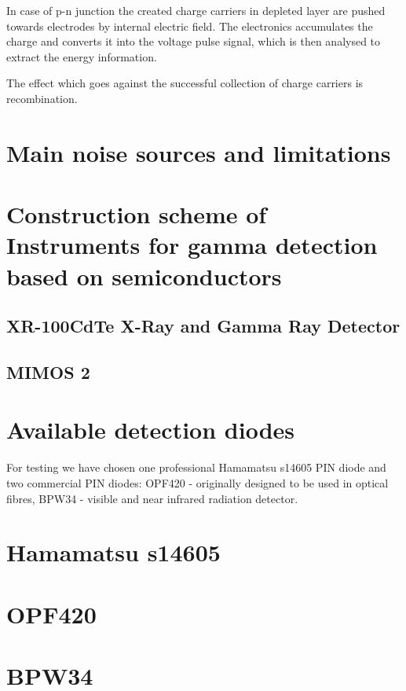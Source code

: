 \par
In case of p-n junction the created charge carriers in depleted layer are pushed towards electrodes by internal electric field. The  electronics accumulates the charge and converts it into the voltage pulse signal, which is then analysed to extract the energy information.


\par
The effect which goes against the successful collection of charge carriers is recombination.

\section{Main noise sources and limitations}

\section{Construction scheme of Instruments for gamma detection based on semiconductors}





\subsection{XR-100CdTe X-Ray and Gamma Ray Detector}

\subsection{MIMOS 2}


\section{Available detection diodes}
For testing we have chosen one professional Hamamatsu s14605 PIN diode and two commercial PIN diodes: OPF420 - originally designed to be used in optical fibres, BPW34 - visible and near infrared radiation detector.  



\section{Hamamatsu s14605}

\section{OPF420}

\section{BPW34}

